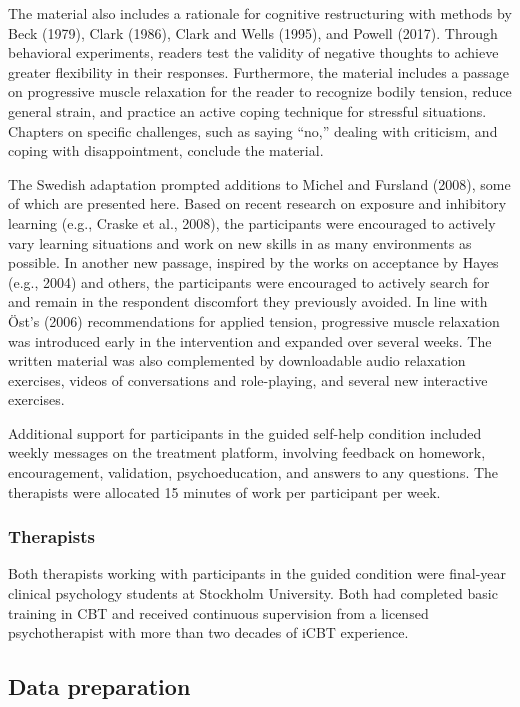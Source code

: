\documentclass[preprint,
3p]{elsarticle} %
\begin{document}
The material also includes a rationale for cognitive restructuring with
methods by Beck (1979), Clark (1986), Clark and Wells (1995), and Powell
(2017). Through behavioral experiments, readers test the validity of
negative thoughts to achieve greater flexibility in their responses.
Furthermore, the material includes a passage on progressive muscle
relaxation for the reader to recognize bodily tension, reduce general
strain, and practice an active coping technique for stressful
situations. Chapters on specific challenges, such as saying ``no,''
dealing with criticism, and coping with disappointment, conclude the
material.

The Swedish adaptation prompted additions to Michel and Fursland (2008),
some of which are presented here. Based on recent research on exposure
and inhibitory learning (e.g., Craske et al., 2008), the participants
were encouraged to actively vary learning situations and work on new
skills in as many environments as possible. In another new passage,
inspired by the works on acceptance by Hayes (e.g., 2004) and others,
the participants were encouraged to actively search for and remain in
the respondent discomfort they previously avoided. In line with Öst's
(2006) recommendations for applied tension, progressive muscle
relaxation was introduced early in the intervention and expanded over
several weeks. The written material was also complemented by
downloadable audio relaxation exercises, videos of conversations and
role-playing, and several new interactive exercises.

Additional support for participants in the guided self-help condition
included weekly messages on the treatment platform, involving feedback
on homework, encouragement, validation, psychoeducation, and answers to
any questions. The therapists were allocated 15 minutes of work per
participant per week.

\hypertarget{therapists}{%
\subsubsection{Therapists}\label{therapists}}

Both therapists working with participants in the guided condition were
final-year clinical psychology students at Stockholm University. Both
had completed basic training in CBT and received continuous supervision
from a licensed psychotherapist with more than two decades of iCBT
experience.

\hypertarget{data-preparation}{%
\subsection{Data preparation}\label{data-preparation}}
\end{document}
